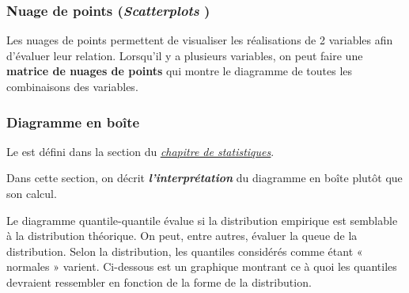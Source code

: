 \documentclass[french]{article}
\begin{document}
\begin{multicols*}{2}
\subsubsection{Nuage de points (\og \textit{Scatterplots} \fg{})}
Les nuages de points permettent de visualiser les réalisations de 2 variables afin d'évaluer leur relation. Lorsqu'il y a plusieurs variables, on peut faire une \textbf{matrice de nuages de points} qui montre le diagramme de toutes les combinaisons des variables.

\subsubsection{Diagramme en boîte}\label{subsubsec:StatLearningBoxPlot}
\begin{rappel_enhanced}[Contexte]
Le \textit{\underline{}} est défini dans la section \textit{\underline{}} du \textit{\color{bleudefrance}\underline{\hyperref[chapt:stats]{\color{bleudefrance} chapitre de statistiques}}}. 

\bigskip

Dans cette section, on décrit \textit{\textbf{l'interprétation}} du diagramme en boîte plutôt que son calcul.
\end{rappel_enhanced}


Le diagramme quantile-quantile évalue si la distribution empirique est semblable à la distribution théorique. On peut, entre autres, évaluer la queue de la distribution. Selon la distribution, les quantiles considérés comme étant « normales » varient. Ci-dessous est un graphique montrant ce à quoi les quantiles devraient ressembler en fonction de la forme de la distribution.

\begin{center}
\begin{tikzpicture}[x=0.75pt,y=0.75pt,yscale=-1,xscale=1]


\end{tikzpicture}
\end{center}
\end{multicols*}
\end{document}
